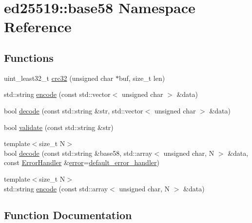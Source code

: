 \hypertarget{namespaceed25519_1_1base58}{}\section{ed25519\+:\+:base58 Namespace Reference}
\label{namespaceed25519_1_1base58}
\subsection*{Functions}
\begin{DoxyCompactItemize}
\item 
uint\+\_\+least32\+\_\+t \mbox{\hyperlink{namespaceed25519_1_1base58_abd4c654a7eba31c01eef529e26a8c364}{crc32}} (unsigned char $\ast$buf, size\+\_\+t len)
\item 
std\+::string \mbox{\hyperlink{namespaceed25519_1_1base58_a857764be1561c5e59bab056d771f22a1}{encode}} (const std\+::vector$<$ unsigned char $>$ \&data)
\item 
bool \mbox{\hyperlink{namespaceed25519_1_1base58_ac8132589f5098b8de74d2dfb72f7bf65}{decode}} (const std\+::string \&str, std\+::vector$<$ unsigned char $>$ \&data)
\item 
bool \mbox{\hyperlink{namespaceed25519_1_1base58_a2b3ccbfdccfbcc3125de0070e5b37e67}{validate}} (const std\+::string \&str)
\item 
{\footnotesize template$<$size\+\_\+t N$>$ }\\bool \mbox{\hyperlink{namespaceed25519_1_1base58_a97f34fe5ffdd0da677a4cef6be3a5a60}{decode}} (const std\+::string \&base58, std\+::array$<$ unsigned char, N $>$ \&data, const \mbox{\hyperlink{namespaceed25519_a6ba572942b3c18591fc869d52a6b16e6}{Error\+Handler}} \&\mbox{\hyperlink{namespaceed25519_ac93d0b5156eaca22197055e902920bc4}{error}}=\mbox{\hyperlink{namespaceed25519_a7c7bb6ed17541162959c33ed3e3b15fb}{default\+\_\+error\+\_\+handler}})
\item 
{\footnotesize template$<$size\+\_\+t N$>$ }\\std\+::string \mbox{\hyperlink{namespaceed25519_1_1base58_a9e1eded8fc634072114771f77046693a}{encode}} (const std\+::array$<$ unsigned char, N $>$ \&data)
\end{DoxyCompactItemize}


\subsection{Function Documentation}
\mbox{\label{namespaceed25519_1_1base58_abd4c654a7eba31c01eef529e26a8c364}} 
